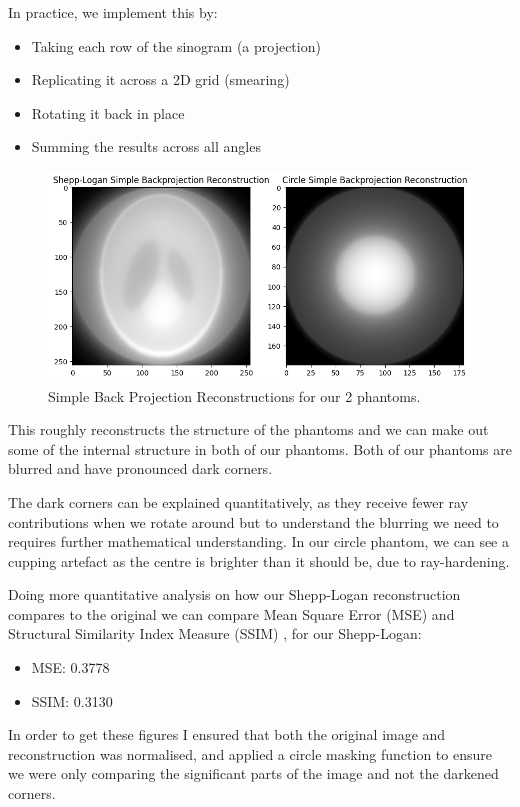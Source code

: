 \documentclass{article}
\theoremstyle{definition}
\begin{document}
In practice, we implement this by:
\begin{itemize}
	\item Taking each row of the sinogram (a projection)
	\item Replicating it across a 2D grid (smearing)
	\item Rotating it back in place
	\item Summing the results across all angles
\end{itemize}

\begin{figure}[H]
	\includegraphics[width=\linewidth]{sbpreconstructions.png}
	\caption{Simple Back Projection Reconstructions for our 2 phantoms.}
	\label{fig:SBPreconstructions}
\end{figure}

This roughly reconstructs the structure of the phantoms and we can make out some of the internal structure in both of our phantoms. Both of our phantoms are blurred and have pronounced dark corners. 

The dark corners can be explained quantitatively, as they receive fewer ray contributions when we rotate around but to understand the blurring we need to requires further mathematical understanding. In our circle phantom, we can see a cupping artefact as the centre is brighter than it should be, due to ray-hardening.

Doing more quantitative analysis on how our Shepp-Logan reconstruction compares to the original we can compare Mean Square Error (MSE) and Structural Similarity Index Measure (SSIM) \cite{Sara2019}, for our Shepp-Logan:
\begin{itemize}
	\item MSE: 0.3778
	\item SSIM: 0.3130
\end{itemize}

In order to get these figures I ensured that both the original image and reconstruction was normalised, and applied a circle masking function to ensure we were only comparing the significant parts of the image and not the darkened corners.
\end{document}
